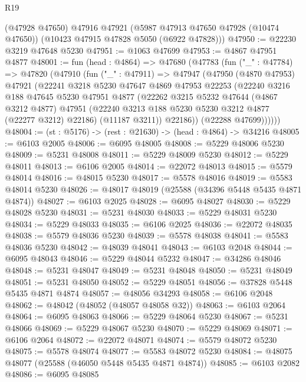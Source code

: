 \begin{lexlean}{R19}
\begin{coremodule}
      (@47928 @47650)
      @47916
      @47921
      (@5987 @47913 @47650 @47928 (@10474 @47650))
      (@10423 @47915 @47828 @5050 (@6922 @47828)))
@47950 := @22230 @3219 @47648 @5230
@47951 := @1063 @47699
@47953 := @4867 @47951 @4877
@48001 := fun (head : @4864) =>
  @47680
    (@47783
      (fun ("_" : @47784) =>
      @47820
        (@47910
          (fun ("_" : @47911) =>
          @47947
            (@47950
              (@4870 @47953)
              @47921
              (@22241
                @3218
                @5230
                @47647
                @4869
                @47953
                @22253
                (@22240
                  @3216
                  @188
                  @47645
                  @5230
                  @47951
                  @4877
                  (@22262
                    @3215
                    @5232
                    @47644
                    (@4867 @3212 @4877)
                    @47951
                    (@22240 @3213 @188 @5230 @5230 @3212 @4877 (@22277 @3212) @22186)
                    (@11187 @3211))
                  @22186))
              (@22288 @47699))))))
@48004 := (st : @5176) -> (rest : @21630) -> (head : @4864) -> @34216
@48005 := @6103 @2005
@48006 := @6095 @48005
@48008 := @5229 @48006 @5230
@48009 := @5231 @48008
@48011 := @5229 @48009 @5230
@48012 := @5229 @48011
@48013 := @6106 @2005
@48014 := @22072 @48013
@48015 := @5579 @48014
@48016 := @48015 @5230
@48017 := @5578 @48016
@48019 := @5583 @48014 @5230
@48026 := @48017 @48019 (@25588 (@34396 @5448 @5435 @4871 @4874))
@48027 := @6103 @2025
@48028 := @6095 @48027
@48030 := @5229 @48028 @5230
@48031 := @5231 @48030
@48033 := @5229 @48031 @5230
@48034 := @5229 @48033
@48035 := @6106 @2025
@48036 := @22072 @48035
@48038 := @5579 @48036 @5230
@48039 := @5578 @48038
@48041 := @5583 @48036 @5230
@48042 := @48039 @48041
@48043 := @6103 @2048
@48044 := @6095 @48043
@48046 := @5229 @48044 @5232
@48047 := @34286 @48046
@48048 := @5231 @48047
@48049 := @5231 @48048
@48050 := @5231 @48049
@48051 := @5231 @48050
@48052 := @5229 @48051
@48056 := @37828 @5448 @5435 @4871 @4874
@48057 := @48056 @34293
@48058 := @6106 @2048
@48062 := @48042 (@48052 (@48057 @48058 @32))
@48063 := @6103 @2064
@48064 := @6095 @48063
@48066 := @5229 @48064 @5230
@48067 := @5231 @48066
@48069 := @5229 @48067 @5230
@48070 := @5229 @48069
@48071 := @6106 @2064
@48072 := @22072 @48071
@48074 := @5579 @48072 @5230
@48075 := @5578 @48074
@48077 := @5583 @48072 @5230
@48084 := @48075 @48077 (@25588 (@46050 @5448 @5435 @4871 @4874))
@48085 := @6103 @2082
@48086 := @6095 @48085

\end{coremodule}
\end{lexlean}
